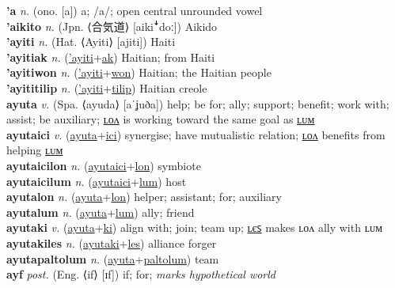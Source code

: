 \textbf{'a} \textit{n.} (ono. [a])
a; /a/; open central unrounded vowel \label{'a} \\
\textbf{'aikito} \textit{n.} (Jpn. ⟨合気道⟩ [aikiꜜdoː])
Aikido \label{'aikito} \\
\textbf{'ayiti} \textit{n.} (Hat. ⟨Ayiti⟩ [ajiti])
Haiti \label{'ayiti} \\
\textbf{'ayitiak} \textit{n.} (\hyperref['ayiti]{'ayiti}+\hyperref[ak]{ak})
Haitian; from Haiti \label{'ayitiak} \\
\textbf{'ayitiwon} \textit{n.} (\hyperref['ayiti]{'ayiti}+\hyperref[won]{won})
Haitian; the Haitian people \label{'ayitiwon} \\
\textbf{'ayititilip} \textit{n.} (\hyperref['ayiti]{'ayiti}+\hyperref[tilip]{tilip})
Haitian creole \label{'ayititilip} \\
\textbf{ayuta} \textit{v.} (Spa. ⟨ayuda⟩ [aˈʝuða])
help; be for; ally; support; benefit; work with; assist; be auxiliary; \hyperref[ayutalon]{ʟᴏᴧ} is working toward the same goal as \hyperref[ayutalum]{ʟᴜᴍ} \label{ayuta} \\
\textbf{ayutaici} \textit{v.} (\hyperref[ayuta]{ayuta}+\hyperref[ici]{ici})
synergise; have mutualistic relation; \hyperref[ayutaicilon]{ʟᴏᴧ} benefits from helping \hyperref[ayutaicilum]{ʟᴜᴍ} \label{ayutaici} \\
\textbf{ayutaicilon} \textit{n.} (\hyperref[ayutaici]{ayutaici}+\hyperref[lon]{lon})
symbiote \label{ayutaicilon} \\
\textbf{ayutaicilum} \textit{n.} (\hyperref[ayutaici]{ayutaici}+\hyperref[lum]{lum})
host \label{ayutaicilum} \\
\textbf{ayutalon} \textit{n.} (\hyperref[ayuta]{ayuta}+\hyperref[lon]{lon})
helper; assistant; for; auxiliary \label{ayutalon} \\
\textbf{ayutalum} \textit{n.} (\hyperref[ayuta]{ayuta}+\hyperref[lum]{lum})
ally; friend \label{ayutalum} \\
\textbf{ayutaki} \textit{v.} (\hyperref[ayuta]{ayuta}+\hyperref[ki]{ki})
align with; join; team up; \hyperref[ayutakiles]{ʟєꜱ} makes ʟᴏᴧ ally with ʟᴜᴍ \label{ayutaki} \\
\textbf{ayutakiles} \textit{n.} (\hyperref[ayutaki]{ayutaki}+\hyperref[les]{les})
alliance forger \label{ayutakiles} \\
\textbf{ayutapaltolum} \textit{n.} (\hyperref[ayuta]{ayuta}+\hyperref[paltolum]{paltolum})
team \label{ayutapaltolum} \\
\textbf{ayf} \textit{post.} (Eng. ⟨if⟩ [ɪf])
if; for; \textit{marks hypothetical world} \label{ayf} \\
